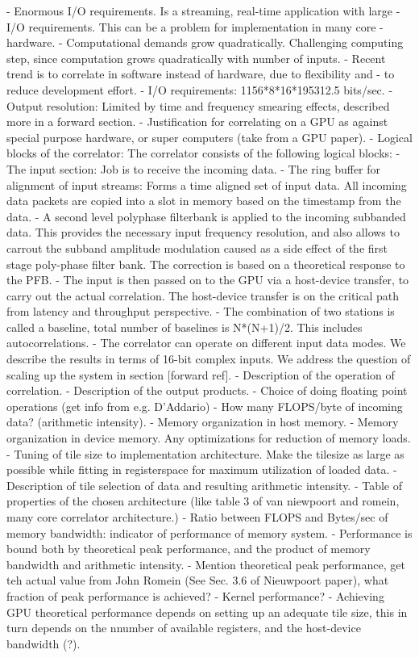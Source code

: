 \documentclass{ws-jai}
\begin{document}
- Enormous I/O  requirements. Is a  streaming, real-time application  with large
- I/O  requirements. This  can  be a  problem for  implementation  in many  core
- hardware.   
- Computational demands  grow  quadratically. Challenging  computing step, since  
  computation grows  quadratically with  number of  inputs.
- Recent trend is to correlate in software  instead of hardware, due to flexibility and
- to reduce development effort.
- I/O requirements: 1156*8*16*195312.5 bits/sec.
- Output resolution: Limited by time and frequency smearing effects, described more in a forward section.
- Justification for correlating on a GPU as against special purpose hardware, or super computers (take from a GPU paper).
- Logical blocks of the correlator:
The correlator consists of the following logical blocks:
- The input section: Job is to receive the incoming data.
- The ring buffer for alignment of input streams: Forms a time aligned set of input data. All incoming data packets are copied into a slot in memory based on the timestamp from the data.
- A second level polyphase filterbank is applied to the incoming subbanded data. This provides the necessary input frequency resolution, and also allows to carrout the subband amplitude modulation caused as a side effect of the first stage poly-phase filter bank. The correction is based on a theoretical response to the PFB.
- The input is then passed on to the GPU via a host-device transfer, to carry out the actual correlation. The host-device transfer is on the critical path from latency and throughput perspective.
- The combination of two stations is called a baseline, total number of baselines is N*(N+1)/2. This includes autocorrelations.
- The correlator can operate on different input data modes. We describe the results in terms of 16-bit complex inputs. We address the question of scaling up the system in section [forward ref].
- Description of the operation of correlation.
- Description of the output products.
- Choice of doing floating point operations (get info from e.g. D'Addario)
- How many FLOPS/byte of incoming data? (arithmetic intensity).
- Memory organization in host memory.
- Memory organization in device memory. Any optimizations for reduction of memory loads.
- Tuning of tile size to implementation architecture. Make the tilesize as large as possible while fitting in registerspace for maximum utilization of loaded data.
- Description of tile selection of data and resulting arithmetic intensity.
- Table of properties of the chosen architecture (like table 3 of van niewpoort and romein, many core correlator architecture.)
- Ratio between FLOPS and Bytes/sec of memory bandwidth: indicator of performance of memory system.
- Performance is bound both by theoretical peak performance, and the product of memory bandwidth and arithmetic intensity.
- Mention theoretical peak performance, get teh actual value from John Romein (See Sec. 3.6 of Nieuwpoort paper), what fraction of peak performance is achieved?
- Kernel performance?
- Achieving GPU theoretical performance depends on setting up an adequate tile size, this in turn depends on the nnumber of available registers, and the host-device bandwidth (?).
\end{document}
